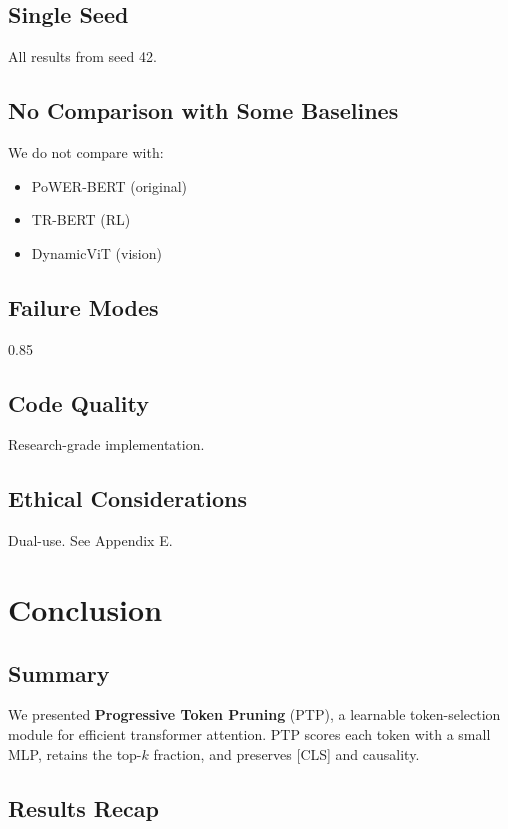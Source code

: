 \subsection{Single Seed}

All results from seed 42.

\subsection{No Comparison with Some Baselines}

We do not compare with:
\begin{itemize}
\item PoWER-BERT (original)
\item TR-BERT (RL)
\item DynamicViT (vision)

\end{itemize}
\subsection{Failure Modes}

0.85

\subsection{Code Quality}

Research-grade implementation.

\subsection{Ethical Considerations}

Dual-use. See Appendix E.




\section{Conclusion}

\subsection{Summary}

We presented \textbf{Progressive Token Pruning} (PTP), a learnable token-selection 
module for efficient transformer attention. PTP scores each token with a 
small MLP, retains the top-$k$ fraction, and preserves [CLS] and causality.

\subsection{Results Recap}

